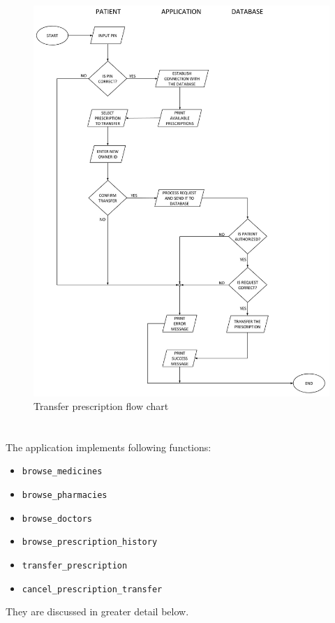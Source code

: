 \begin{figure}
\includegraphics[width=\linewidth]{patient/transferPrescriptionFlowChart}
\caption{Transfer prescription flow chart}
\end{figure}


\newpage

\chapter {}

The application implements following functions:
\begin{itemize}
\item \texttt{browse\_medicines}
\item \texttt{browse\_pharmacies}
\item \texttt{browse\_doctors}
\item \texttt{browse\_prescription\_history}
\item \texttt{transfer\_prescription}
\item \texttt{cancel\_prescription\_transfer}
\end{itemize}
They are discussed in greater detail below.

